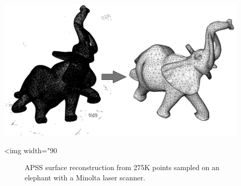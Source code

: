 \begin{center}
    \label{Surface_reconstruction_3-fig-introduction}
    \begin{ccTexOnly}
        \includegraphics[width=0.9\textwidth]{Surface_reconstruction_3/introduction} %
    \end{ccTexOnly}
    \begin{ccHtmlOnly}
        <img width="90%
    \end{ccHtmlOnly}
    \begin{figure}[h]
        \caption{APSS surface reconstruction from 275K
                 points sampled on an elephant
                 with a Minolta laser scanner.}
    \end{figure}
\end{center}


